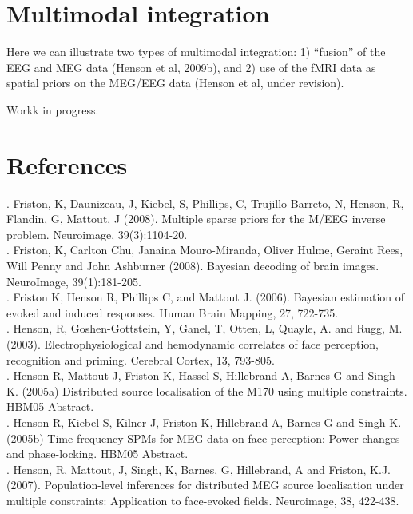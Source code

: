 \section{Multimodal integration \label{multimodal:integration}}

Here we can illustrate two types of multimodal integration: 1) ``fusion'' of the EEG and MEG data (Henson et al, 2009b), and 2) use of the fMRI data as spatial priors on the MEG/EEG data (Henson et al, under revision).

Workk in progress.

\section{References}

. Friston, K, Daunizeau, J, Kiebel, S, Phillips, C, Trujillo-Barreto, N, Henson, R, Flandin, G, Mattout, J (2008). Multiple sparse priors for the M/EEG inverse problem. Neuroimage, 39(3):1104-20.\\

. Friston, K, Carlton Chu, Janaina Mouro-Miranda, Oliver Hulme, Geraint Rees, Will Penny and John Ashburner (2008). Bayesian decoding of brain images. NeuroImage, 39(1):181-205.\\

. Friston K, Henson R, Phillips C, and Mattout J. (2006). Bayesian estimation of evoked and induced responses. Human Brain Mapping, 27, 722-735.\\

. Henson, R, Goshen-Gottstein, Y, Ganel, T, Otten, L, Quayle, A. and Rugg, M. (2003). Electrophysiological and hemodynamic correlates of face perception, recognition and priming. Cerebral Cortex, 13, 793-805.\\

. Henson R, Mattout J, Friston K, Hassel S, Hillebrand A, Barnes G and Singh K. (2005a) Distributed source localisation of the M170 using multiple constraints. HBM05 Abstract.\\

. Henson R, Kiebel S, Kilner J, Friston K, Hillebrand A, Barnes G and Singh K. (2005b) Time-frequency SPMs for MEG data on face perception: Power changes and phase-locking. HBM05 Abstract.\\

. Henson, R, Mattout, J, Singh, K, Barnes, G, Hillebrand, A and Friston, K.J. (2007). Population-level inferences for distributed MEG source localisation under multiple constraints: Application to face-evoked fields. Neuroimage, 38, 422-438.\\

